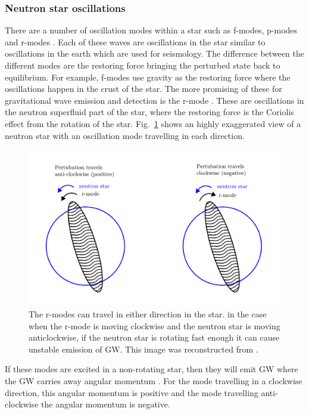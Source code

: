  \subsubsection{Neutron star oscillations}
There are a number of oscillation modes within a star such as f-modes, p-modes and r-modes \citep{becker2009NeutronStars}. 
Each of these waves are oscillations in the star similar to oscillations in the earth which are used for seismology.
The difference between the different modes are the restoring force bringing the perturbed state back to equilibrium.
For example, f-modes use gravity as the restoring force where the oscillations happen in the crust of the star.
The more promising of these for gravitational wave emission and detection is the r-mode \citep{lasky2015GravitationalWaves}. 
These are oscillations in the neutron superfluid part of the star, where the restoring force is the Coriolis effect from the rotation of the star.
Fig.~\ref{intro:source:cw:rmode} shows an highly exaggerated view of a neutron star with an oscillation mode travelling in each direction.
\begin{figure}[h]
	\centering
	\includegraphics[width=\textwidth]{C1_intro/rmode.pdf}
	\caption{The r-modes can travel in either direction in the star. in the case when the r-mode is moving clockwise and the neutron star is moving anticlockwise, if the neutron star is rotating fast enough it can cause unstable emission of \gls{GW}. This image was reconstructed from \citep{jonesCFSInstability}.}
	\label{intro:source:cw:rmode}
\end{figure}
If these modes are excited in a non-rotating star, then they will emit \gls{GW} where the \gls{GW}  carries away angular momentum \citep{jonesCFSInstability}. 
For the mode travelling in a clockwise direction, this angular momentum is positive and the mode travelling anti-clockwise the angular momentum is negative. 
